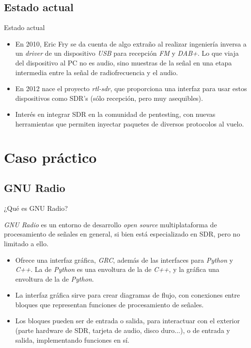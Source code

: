 \documentclass{beamer}
\begin{document}
\subsection{Estado actual}

\begin{frame}{Estado actual}

\begin{itemize}
	\item En 2010, Eric Fry se da cuenta de algo extraño al realizar ingeniería inversa a un \emph{driver} de un dispositivo \emph{USB} para recepción \emph{FM} y \emph{DAB+}. Lo que viaja del dispositivo al PC no es audio, sino muestras de la señal en una etapa intermedia entre la señal de radiofrecuencia y el audio.
	\item En 2012 nace el proyecto \emph{rtl-sdr}, que proporciona una interfaz para usar estos dispositivos como SDR's (sólo recepción, pero muy asequibles).
	\item Interés en integrar SDR en la comunidad de pentesting, con nuevas herramientas que permiten inyectar paquetes de diversos protocolos al vuelo.
\end{itemize}

\end{frame}

\section{Caso práctico}

\subsection{GNU Radio}

\begin{frame}{¿Qué es GNU Radio?}

\emph{GNU Radio} es un entorno de desarrollo \emph{open source} multiplataforma de procesamiento de señales en general, si bien está especializado en SDR, pero no limitado a ello.

\begin{itemize}
	\item Ofrece una interfaz gráfica, \emph{GRC}, además de las interfaces para \emph{Python} y \emph{C++}. La de \emph{Python} es una envoltura de la de \emph{C++}, y la gráfica una envoltura de la de \emph{Python}.
	\item La interfaz gráfica sirve para crear diagramas de flujo, con conexiones entre bloques que representan funciones de procesamiento de señales.
	\item Los bloques pueden ser de entrada o salida, para interactuar con el exterior (parte hardware de SDR, tarjeta de audio, disco duro...), o de entrada y salida, implementando funciones en sí.
\end{itemize}

\end{frame}
\end{document}
